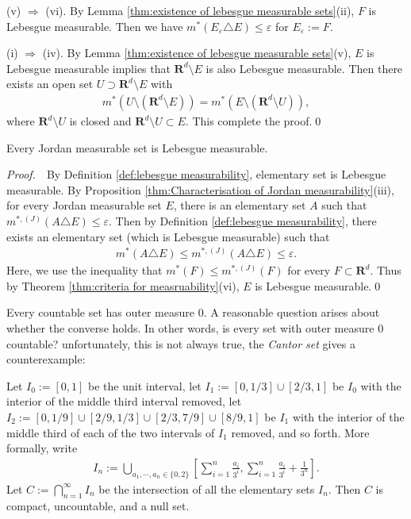 \documentclass{book}
\theoremstyle{defstyle}
\theoremstyle{thmstyle}
\newcommand{\JOM}{m^{*, (J)}}%
\newcommand{\pff}{\noindent\emph{Proof.}~~}
\newcommand{\newa}{\vspace{1em}\indent}
\newcounter{Proposition}[section]
\begin{document}
(v) $\Rightarrow$ (vi). By Lemma \ref{thm:existence of lebesgue measurable sets}(ii), $F$ is Lebesgue measurable. Then we have $m^*(E_\varepsilon \triangle E) \leq \varepsilon$ for $E_\varepsilon := F$.

(i) $\Rightarrow$ (iv). By Lemma \ref{thm:existence of lebesgue measurable sets}(v), $E$ is Lebesgue measurable implies that $\mathbf{R}^d \setminus E$ is also Lebesgue measurable. Then there exists an open set $U \supset \mathbf{R}^d \setminus E$ with
    \begin{align*}
        m^*(U \setminus (\mathbf{R}^d \setminus E))
        = m^*(E \setminus (\mathbf{R}^d \setminus U)),
    \end{align*}
where $\mathbf{R}^d \setminus U$ is closed and $\mathbf{R}^d \setminus U \subset E$. This complete the proof.\qed


\begin{proposition}
    Every Jordan measurable set is Lebesgue measurable.
\end{proposition}

\pff By Definition \ref{def:lebesgue measurability}, elementary set is Lebesgue measurable. By Proposition \ref{thm:Characterisation of Jordan measurability}(iii), for every Jordan measurable set $E$, there is an elementary set $A$ such that $\JOM(A \triangle E) \leq \varepsilon$. Then by Definition \ref{def:lebesgue measurability}, there exists an elementary set (which is Lebesgue measurable) such that
    \begin{align*}
        m^*(A \triangle E) \leq \JOM(A \triangle E) \leq \varepsilon.
    \end{align*}
Here, we use the inequality that $m^*(F) \leq \JOM(F)$ for every $F \subset \mathbf{R}^d$. Thus by Theorem \ref{thm:criteria for measruability}(vi), $E$ is Lebesgue measurable.\qed

\newa Every countable set has outer measure $0$. A reasonable question arises about whether the converse holds. In other words, is every set with outer measure $0$ countable? unfortunately, this is not always true, the \emph{Cantor set} gives a counterexample:

\begin{example}
    Let $I_0 := [0, 1]$ be the unit interval, let $I_1 := [0, 1/3] \cup [2/3, 1]$ be $I_0$ with the interior of the middle third interval removed, let $I_2 := [0, 1/9] \cup [2/9, 1/3] \cup [2/3, 7/9] \cup [8/9, 1]$ be $I_1$ with the interior of the middle third of each of the two intervals of $I_1$ removed, and so forth. More formally, write
        \begin{align*}
            I_n := \bigcup_{a_1, \cdots, a_n \in \{0, 2\}}\left[\sum_{i = 1}^{n}\frac{a_i}{3^i}, \sum_{i = 1}^{n}\frac{a_i}{3^i} + \frac{1}{3^n}\right].
        \end{align*}
    Let $C := \bigcap_{n = 1}^{\infty} I_n$ be the intersection of all the elementary sets $I_n$. Then $C$ is compact, uncountable, and a null set.
\end{example}
\end{document}
